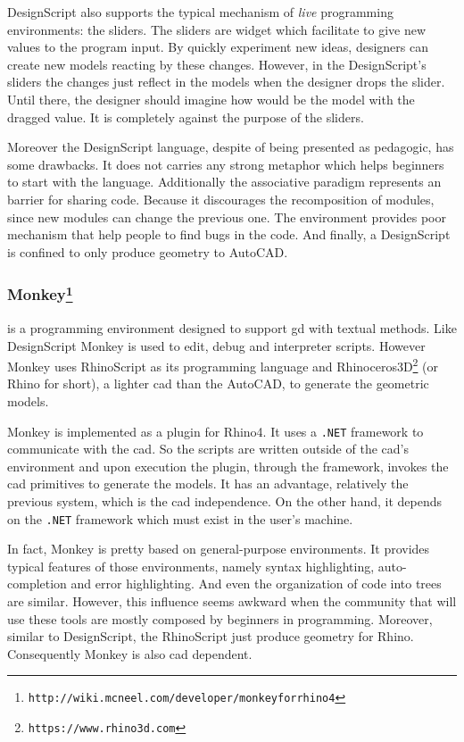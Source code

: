 DesignScript also supports the typical mechanism of \textit{live} programming environments: the sliders. The sliders are widget which facilitate to give new values to the program input. By quickly experiment new ideas, designers can create new models reacting by these changes. However, in the DesignScript's sliders the changes just reflect in the models when the designer drops the slider. Until there, the designer should imagine how would be the model with the dragged value. It is completely against the purpose of the sliders.

Moreover the DesignScript language, despite of being presented as pedagogic, has some drawbacks. It does not carries any strong metaphor which helps beginners to start with the language. Additionally the associative paradigm represents an barrier for sharing code. Because it discourages the recomposition of modules, since new modules can change the previous one. The environment provides poor mechanism that help people to find bugs in the code. And finally, a DesignScript is confined to only produce geometry to AutoCAD.
\subsubsection{Monkey\protect\footnote{\texttt{http://wiki.mcneel.com/developer/monkeyforrhino4}}} is a programming environment designed to support \ac{gd} with textual methods. Like DesignScript Monkey is used to edit, debug and interpreter scripts. However Monkey uses RhinoScript as its programming language and Rhinoceros3D\footnote{\label{rhin}\texttt{https://www.rhino3d.com}} (or Rhino for short), a lighter \ac{cad} than the AutoCAD, to generate the geometric models.

Monkey is implemented as a plugin for Rhino4. It uses a \texttt{.NET} framework to communicate with the \ac{cad}. So the scripts are written outside of the \ac{cad}'s environment and upon execution the plugin, through the framework, invokes the \ac{cad} primitives to generate the models. It has an advantage, relatively the previous system, which is the \ac{cad} independence. On the other hand, it depends on the \texttt{.NET} framework which must exist in the user's machine.

In fact, Monkey is pretty based on general-purpose environments. It provides typical features of those environments, namely syntax highlighting, auto-completion and error highlighting. And even the organization of code into trees are similar. However, this influence seems awkward when the community that will use these tools are mostly composed by beginners in programming. Moreover, similar to DesignScript, the RhinoScript just produce geometry for Rhino. Consequently Monkey is also \ac{cad} dependent. 

